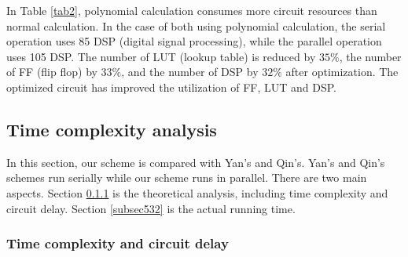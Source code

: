 \begin{table}[!htb]
	\begin{center}
	\caption{{\color{red}Circuit resource consumption}}\label{tab2}
\vspace{-2.0em}
	\end{center}
\end{table}

In Table \ref{tab2}, polynomial calculation consumes more circuit resources than normal calculation. In the case of both using polynomial calculation, the serial operation uses 85 DSP (digital signal processing), while the parallel operation uses 105 DSP. The number of LUT (lookup table) is reduced by $35\%$, the number of FF (flip flop) by $33\%$, and the number of DSP by $32\%$ after optimization. The optimized circuit has improved the utilization of FF, LUT and DSP.

\subsection{Time complexity analysis}\label{subsec53}

In this section, our scheme is compared with Yan's and Qin's. Yan's and Qin's schemes run serially while our scheme runs in parallel. There are two main aspects. Section \ref{subsec531} is the theoretical analysis, including time complexity and circuit delay. Section \ref{subsec532} is the actual running time.

\subsubsection{Time complexity and circuit delay}\label{subsec531}

